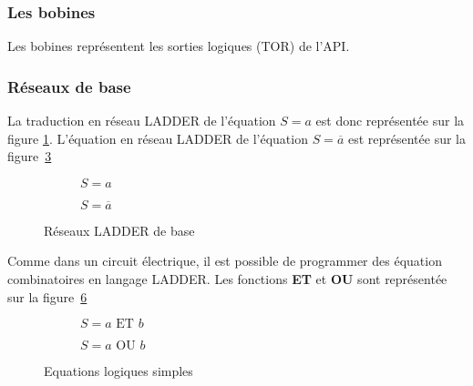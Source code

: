 \subsubsection{Les bobines}

Les bobines représentent les sorties logiques (TOR) de l'API.



\subsubsection{Réseaux de base}

La traduction en réseau LADDER de l'équation $S = a$ est donc représentée sur la figure \ref{fig:ladAtoS}. L'équation en réseau LADDER de l'équation $S = \overline{a}$ est représentée sur la figure~\ref{fig:ladABartoS}

\begin{figure}[ht]
  \begin{subfigure}[b]{.49\textwidth}
  \centering
    
    \caption{$S = a$}
    \label{fig:ladAtoS}
  \end{subfigure}
  \begin{subfigure}[b]{.49\textwidth}
  \centering
    
    \caption{$S = \overline{a}$}
    \label{fig:ladABartoS}
  \end{subfigure}

  \caption{Réseaux LADDER de base}
\end{figure}

Comme dans un circuit électrique, il est possible de programmer des équation combinatoires en langage LADDER. Les fonctions \textbf{ET} et \textbf{OU} sont représentée sur la figure~\ref{fig:equaLogiques}

\begin{figure}[ht]
  \begin{subfigure}[b]{.49\textwidth}
    \centering
    
    \caption{$S = a \text{ ET } b$}
    \label{fig:aETb}
  \end{subfigure}
  \begin{subfigure}[b]{.49\textwidth}
    \centering
    
    \caption{$S = a \text{ OU } b$}
    \label{fig:aOUb}
  \end{subfigure}
  \caption{Equations logiques simples}
  \label{fig:equaLogiques}
\end{figure}


